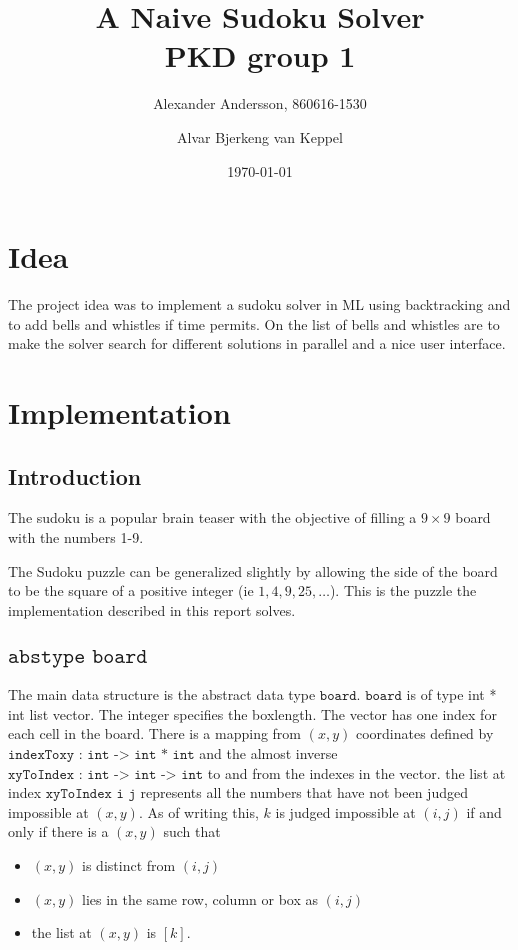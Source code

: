 \documentclass[12pt, a4paper]{article}
\title{A Naive Sudoku Solver\\\small{PKD group 1}}
\author{Alexander Andersson, 860616-1530 \and Alvar Bjerkeng van Keppel}
\date{\today}
\begin{document}
\maketitle

\begin{abstract}

\end{abstract}

\tableofcontents

\section{Idea}

The project idea was to implement a sudoku solver in ML using backtracking and to add bells and whistles if time permits. On the list of bells and whistles are to make the solver search for different solutions in parallel and a nice user interface.

\section{Implementation}

\subsection{Introduction}

The sudoku is a popular brain teaser with the objective of filling a $9\times 9$ board with the numbers 1-9.

The Sudoku puzzle can be generalized slightly by allowing the side of the board to be the square of a positive integer (ie $1, 4, 9, 25, \dots$). This is the puzzle the implementation described in this report solves.

\subsection{$\texttt{abstype board}$}
The main data structure is the abstract data type $\texttt{board}$. $\texttt{board}$ is of type int * int list vector. The integer specifies the boxlength. The vector has one index for each cell in the board. There is a mapping from $(x,y)$ coordinates defined by $\texttt{indexToxy : int -> int * int}$ and the almost inverse $\texttt{xyToIndex : int -> int -> int}$ to and from the indexes in the vector. the list at index $\texttt{xyToIndex i j}$ represents all the numbers that have not been judged impossible at $(x,y)$. As of writing this, $k$ is judged impossible at $(i,j)$ if and only if there is a $(x,y)$ such that
\begin{itemize}
\item $(x,y)$ is distinct from $(i,j)$
\item $(x,y)$ lies in the same row, column or box as $(i,j)$
\item the list at $(x,y)$ is $[k]$.
\end{itemize}
\end{document}
